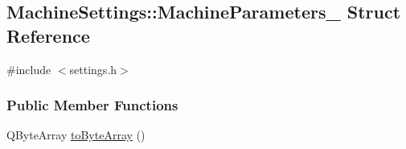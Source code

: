 \hypertarget{structMachineSettings_1_1MachineParameters__}{}\subsection{Machine\+Settings\+:\+:Machine\+Parameters\+\_\+ Struct Reference}
\label{structMachineSettings_1_1MachineParameters__}


{\ttfamily \#include $<$settings.\+h$>$}

\subsubsection*{Public Member Functions}
\begin{DoxyCompactItemize}
\item 
Q\+Byte\+Array \mbox{\hyperlink{structMachineSettings_1_1MachineParameters___a7c9a7fa5df12c0dcfa7747025c99cf3d}{to\+Byte\+Array}} ()
\end{DoxyCompactItemize}
